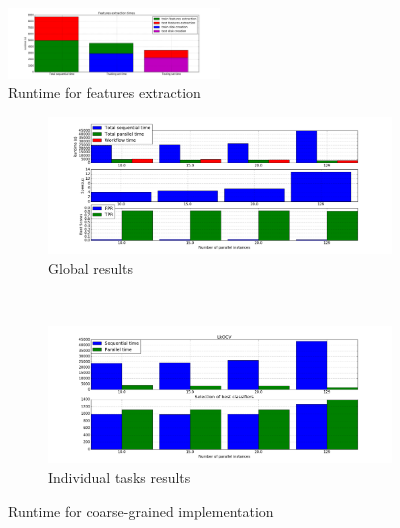 \documentclass[10pt, conference, compsocconf]{IEEEtran}
\begin{document}
\setlength{\belowcaptionskip}{-6pt}
\setlength{\intextsep}{0pt}
\setlength{\textfloatsep}{1pt}

\begin{figure}
  \centering
  \includegraphics[width=0.5\textwidth]{Figures/times_extraction.png}
  \caption{Runtime for features extraction \label{fig:times_extraction}}
\end{figure}

\begin{figure}
  \begin{center}
    \begin{subfigure}{0.5\textwidth}
      \captionsetup{skip=0pt}
      \centering
      \includegraphics[width=\textwidth]{Figures/times_fixedparams_global_bars.png}
      \caption{\footnotesize Global results \label{subfig:granularity_glob}}
    \end{subfigure}\\
  \begin{subfigure}{0.5\textwidth}
    \captionsetup{skip=0pt}
    \centering
    \includegraphics[width=\textwidth]{Figures/times_fixedparams_individual_bars.png}
    \caption{\footnotesize Individual tasks results \label{subfig:granularity_ind}}
  \end{subfigure}
\end{center}
\caption{Runtime for coarse-grained implementation \label{fig:granularity}}
\end{figure}
\end{document}
